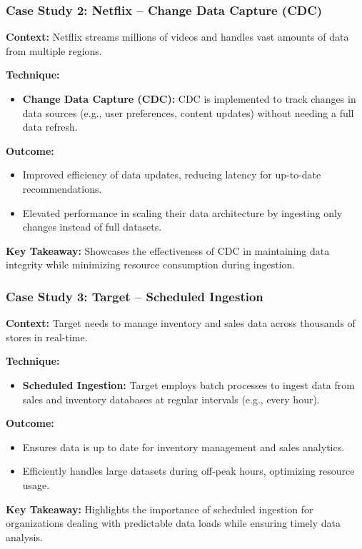 \documentclass{beamer}
\begin{document}
\begin{frame}[fragile]
    \frametitle{Case Study 2: Netflix – Change Data Capture (CDC)}
    
    \textbf{Context:}  
    Netflix streams millions of videos and handles vast amounts of data from multiple regions.  
    
    \textbf{Technique:}  
    \begin{itemize}
        \item \textbf{Change Data Capture (CDC):}  
        CDC is implemented to track changes in data sources (e.g., user preferences, content updates) without needing a full data refresh.
    \end{itemize}
    
    \textbf{Outcome:}  
    \begin{itemize}
        \item Improved efficiency of data updates, reducing latency for up-to-date recommendations.
        \item Elevated performance in scaling their data architecture by ingesting only changes instead of full datasets.
    \end{itemize}
    
    \textbf{Key Takeaway:}  
    Showcases the effectiveness of CDC in maintaining data integrity while minimizing resource consumption during ingestion.
\end{frame}

\begin{frame}[fragile]
    \frametitle{Case Study 3: Target – Scheduled Ingestion}
    
    \textbf{Context:}  
    Target needs to manage inventory and sales data across thousands of stores in real-time.  
    
    \textbf{Technique:}  
    \begin{itemize}
        \item \textbf{Scheduled Ingestion:}  
        Target employs batch processes to ingest data from sales and inventory databases at regular intervals (e.g., every hour).
    \end{itemize}
    
    \textbf{Outcome:}  
    \begin{itemize}
        \item Ensures data is up to date for inventory management and sales analytics.
        \item Efficiently handles large datasets during off-peak hours, optimizing resource usage.
    \end{itemize}
    
    \textbf{Key Takeaway:}  
    Highlights the importance of scheduled ingestion for organizations dealing with predictable data loads while ensuring timely data analysis.
\end{frame}
\end{document}

